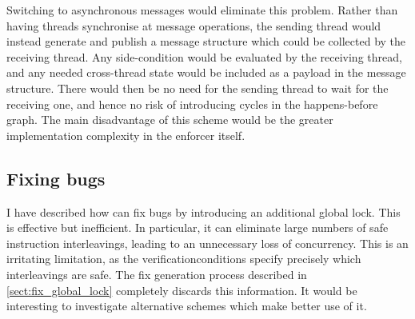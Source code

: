Switching to asynchronous messages would eliminate this problem.
Rather than having threads synchronise at message operations, the
sending thread would instead generate and publish a message structure
which could be collected by the receiving thread.  Any side-condition
would be evaluated by the receiving thread, and any needed
cross-thread state would be included as a payload in the message
structure.  There would then be no need for the sending thread to wait
for the receiving one, and hence no risk of introducing cycles in the
happens-before graph.  The main disadvantage of this scheme would be
the greater implementation complexity in the enforcer itself.

\subsection{Fixing bugs}

I have described how {\technique} can fix bugs by introducing an
additional global lock.  This is effective but inefficient.  In
particular, it can eliminate large numbers of safe instruction
interleavings, leading to an unnecessary loss of concurrency.  This is
an irritating limitation, as the \glspl{verificationcondition} specify
precisely which interleavings are safe.  The fix generation process
described in \autoref{sect:fix_global_lock} completely discards this
information.  It would be interesting to investigate alternative
schemes which make better use of it.
  
